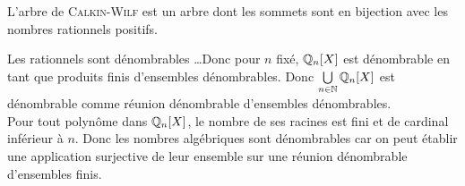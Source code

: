 \begin{marginfigure}
    
    \note L'arbre de \textsc{Calkin}-\textsc{Wilf} est un arbre dont les sommets sont en bijection avec les nombres rationnels positifs.
\end{marginfigure}

\begin{solution}
Les rationnels sont dénombrables \dots \note Donc pour $n$ fixé, $\mathbb{Q}_n[X]$ est dénombrable en tant que produits finis d'ensembles dénombrables.
Donc $\bigcup\limits_{n \in \mathbb{N}} \mathbb{Q}_n[X]$ est dénombrable comme réunion dénombrable d'ensembles dénombrables. \\
Pour tout polynôme dans $\mathbb{Q}_n[X]$, le nombre de ses racines est fini et de cardinal inférieur à $n$. 
Donc les nombres algébriques sont dénombrables car on peut établir une application surjective de leur ensemble sur une réunion dénombrable d'ensembles finis. 
\end{solution}